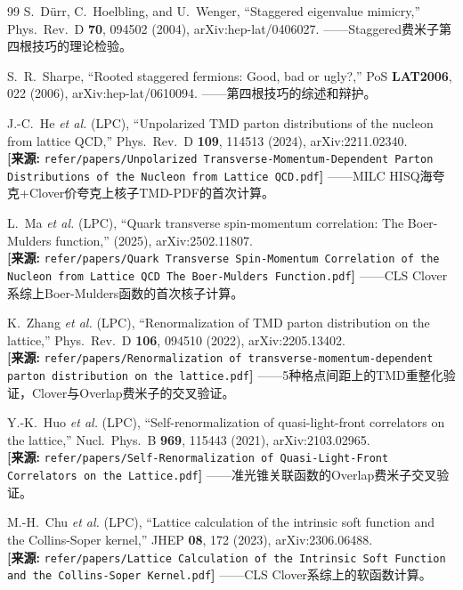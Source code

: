 \documentclass[12pt,a4paper]{ctexart}
\theoremstyle{definition}
\begin{document}
\begin{thebibliography}{99}
S.~D\"urr, C.~Hoelbling, and U.~Wenger,
``Staggered eigenvalue mimicry,''
Phys.\ Rev.\ D \textbf{70}, 094502 (2004), arXiv:hep-lat/0406027.
——Staggered费米子第四根技巧的理论检验。

S.~R.~Sharpe,
``Rooted staggered fermions: Good, bad or ugly?,''
PoS \textbf{LAT2006}, 022 (2006), arXiv:hep-lat/0610094.
——第四根技巧的综述和辩护。

J.-C.~He \textit{et al.} (LPC),
``Unpolarized TMD parton distributions of the nucleon from lattice QCD,''
Phys.\ Rev.\ D \textbf{109}, 114513 (2024), arXiv:2211.02340.
\\\textbf{[来源:} \texttt{refer/papers/Unpolarized Transverse-Momentum-Dependent Parton Distributions of the Nucleon from Lattice QCD.pdf}\textbf{]}
——MILC HISQ海夸克+Clover价夸克上核子TMD-PDF的首次计算。

L.~Ma \textit{et al.} (LPC),
``Quark transverse spin-momentum correlation: The Boer-Mulders function,''
(2025), arXiv:2502.11807.
\\\textbf{[来源:} \texttt{refer/papers/Quark Transverse Spin-Momentum Correlation of the Nucleon from Lattice QCD The Boer-Mulders Function.pdf}\textbf{]}
——CLS Clover系综上Boer-Mulders函数的首次核子计算。

K.~Zhang \textit{et al.} (LPC),
``Renormalization of TMD parton distribution on the lattice,''
Phys.\ Rev.\ D \textbf{106}, 094510 (2022), arXiv:2205.13402.
\\\textbf{[来源:} \texttt{refer/papers/Renormalization of transverse-momentum-dependent parton distribution on the lattice.pdf}\textbf{]}
——5种格点间距上的TMD重整化验证，Clover与Overlap费米子的交叉验证。

Y.-K.~Huo \textit{et al.} (LPC),
``Self-renormalization of quasi-light-front correlators on the lattice,''
Nucl.\ Phys.\ B \textbf{969}, 115443 (2021), arXiv:2103.02965.
\\\textbf{[来源:} \texttt{refer/papers/Self-Renormalization of Quasi-Light-Front Correlators on the Lattice.pdf}\textbf{]}
——准光锥关联函数的Overlap费米子交叉验证。

M.-H.~Chu \textit{et al.} (LPC),
``Lattice calculation of the intrinsic soft function and the Collins-Soper kernel,''
JHEP \textbf{08}, 172 (2023), arXiv:2306.06488.
\\\textbf{[来源:} \texttt{refer/papers/Lattice Calculation of the Intrinsic Soft Function and the Collins-Soper Kernel.pdf}\textbf{]}
——CLS Clover系综上的软函数计算。


\end{thebibliography}
\end{document}
